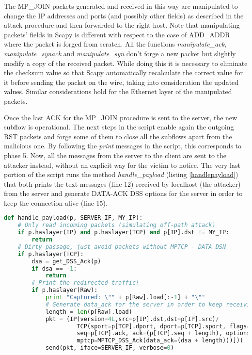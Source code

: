 The MP\_JOIN packets generated and received in this way are manipulated to change the IP addresses and ports (and possibly other fields) as described in the attack procedure and then forwarded to the right host. Note that manipulating packets' fields in Scapy is different with respect to the case of ADD\_ADDR where the packet is forged from scratch. All the functions \textit{manipulate\_ack}, \textit{manipulate\_synack} and \textit{manipulate\_syn} don't forge a new packet but slightly modify a copy of the received packet. While doing this it is necessary to eliminate the checksum value so that Scapy automatically recalculate the correct value for it before sending the packet on the wire, taking into consideration the updated values. Similar considerations hold for the Ethernet layer of the manipulated packets.

Once the last ACK for the MP\_JOIN procedure is sent to the server, the new subflow is operational. The next steps in the script enable again the outgoing RST packets and forge some of them to close all the subflows apart from the malicious one. By following the \textit{print} messages in the script, this corresponds to phase 5. Now, all the messages from the server to the client are sent to the attacker instead, without an explicit way for the victim to notice.
The very last portion of the script runs the method \textit{handle\_payload} (listing \ref{handlepayload}) that both prints the text messages (line 12) received by localhost (the attacker) from the server and generate DATA-ACK DSS options for the server in order to keep the connection alive (line 15).

\begin{lstlisting}[language=python, caption=Filter function for the sniffing tool when receiving redirected traffic of the hijacked connection from the server, label=handlepayload]
def handle_payload(p, SERVER_IF, MY_IP):
    # Only read incoming packets (simulating off-path attack)
    if p.haslayer(IP) and p.haslayer(TCP) and p[IP].dst != MY_IP:
        return
    # Dirty passage, just avoid packets without MPTCP - DATA DSN
    if p.haslayer(TCP):
        dsa = get_DSS_Ack(p)
        if dsa == -1:
            return
        # Print the redirected traffic!
        if p.haslayer(Raw):
            print "Captured: \"" + p[Raw].load[:-1] + "\""
            # Generate data_ack for the server in order to keep receiving the next messages
            length = len(p[Raw].load)
            pkt = (IP(version=4L,src=p[IP].dst,dst=p[IP].src)/                          \
                     TCP(sport=p[TCP].dport, dport=p[TCP].sport, flags="A",             \
                     seq=p[TCP].ack, ack=(p[TCP].seq + length), options=[TCPOption_MP(  \
                     mptcp=MPTCP_DSS_Ack(data_ack=(dsa + length)))]))
            send(pkt, iface=SERVER_IF, verbose=0)
\end{lstlisting}

